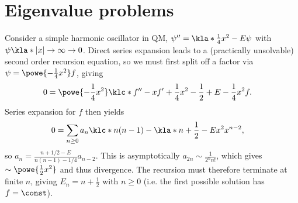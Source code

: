 \documentclass[english, parskip=full]{scrartcl}
\begin{document}
\section{Eigenvalue problems}
Consider a simple harmonic oscillator in QM, $\psi'' = \kla*{\frac{1}{4}x^2 - E}\psi$ with $\psi\kla*{|x|\rightarrow \infty}\rightarrow 0$.
Direct series expansion leads to a (practically unsolvable) second order recursion equation, so we must first split off a factor via $\psi = \powe{-\frac{1}{4}x^2} f$, giving
\begin{align}
0 &= \powe{-\frac{1}{4} x^2} \klc*{f'' - xf' + \frac{1}{4}x^2 - \frac{1}{2} + E - \frac{1}{4}x^2}f.
\end{align}
Series expansion for $f$ then yields
\begin{align}
0 &= \sum_{n\ge 0} a_n \klc*{n(n-1) - \kla*{n+\frac{1}{2}-E} x^2}x^{n-2},
\end{align}
so $a_n = \frac{n+1/2 - E}{n(n-1)-1/4} a_{n-2}$.
This is asymptotically $a_{2n} \sim \frac{1}{2^n n!}$, which gives $\sim\powe{\frac{1}{2}x^2}$ and thus divergence.
The recursion must therefore terminate at finite $n$, giving $E_n=n+\frac{1}{2}$ with $n\ge 0$ (i.e. the first possible solution has $f=\const$).
\end{document}
